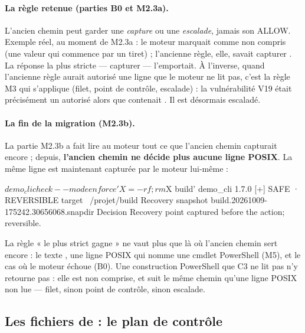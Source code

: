 \paragraph{La règle retenue (parties B0 et M2.3a).} L'ancien chemin peut garder une
\emph{capture} ou une \emph{escalade}, jamais son ALLOW. Exemple réel, au moment de M2.3a : le
moteur marquait  comme non compris (une valeur qui commence par un
tiret) ; l'ancienne règle, elle, savait capturer . La réponse la plus stricte ---
capturer --- l'emportait. À l'inverse, quand l'ancienne règle aurait autorisé une ligne que le
moteur ne lit pas, c'est la règle M3 qui s'applique (filet, point de contrôle, escalade) : la
vulnérabilité V19 était précisément un  autorisé alors que
 contenait . Il est désormais escaladé.

\paragraph{La fin de la migration (M2.3b).} La partie M2.3b a fait lire au moteur tout ce que
l'ancien chemin capturait encore ; depuis, \textbf{l'ancien chemin ne décide plus aucune ligne
POSIX}. La même ligne est maintenant capturée par le moteur lui-même :

\begin{terminal}
$ demo_cli check --mode enforce 'X=-rf; rm $X build'
demo_cli 1.7.0  [+] SAFE  ·  REVERSIBLE
  target              ~/projet/build
Recovery
  snapshot            build.20261009-175242.30656068.snapdir
Decision
  Recovery point captured before the action; reversible.
\end{terminal}

La règle « le plus strict gagne » ne vaut plus que là où l'ancien chemin sert encore : le texte
, une ligne POSIX qui nomme une cmdlet PowerShell (M5), et le cas où le moteur
échoue (B0). Une construction PowerShell que C3 ne lit pas
n'y retourne pas : elle est non comprise, et suit le même chemin qu'une ligne POSIX non lue
--- filet, sinon point de contrôle, sinon escalade.

\subsection{Les fichiers de \texorpdfstring{\demo}{demo\_cli} : le plan de contrôle}
\label{sec:plan-controle}

